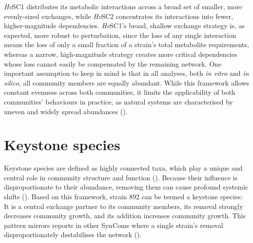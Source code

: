 \textit{Hv}SC1 distributes its metabolic interactions across a broad set of smaller, more evenly-sized exchanges, while \textit{Hv}SC2 concentrates its interactions into fewer, higher-magnitude dependencies. \textit{Hv}SC1’s broad, shallow exchange strategy is, as expected, more robust to perturbation, since the loss of any single interaction means the loss of only a small fraction of a strain's total metabolite requirements, whereas a narrow, high-magnitude strategy creates more critical dependencies whose loss cannot easily be compensated by the remaining network.
One important assumption to keep in mind is that in all analyses, both \textit{in vitro }and\textit{ in silico}, all community members are equally abundant. While this framework allows constant evenness across both communities, it limits the applicability of both communities’ behaviours in practice, as natural systems are characterised by uneven and widely spread abundances (\cite{dawson_small_2017}).

\section{Keystone species}
Keystone species are defined as highly connected taxa, which play a unique and central role in community structure and function (\cite{banerjee_keystone_2018}). Because their influence is disproportionate to their abundance, removing them can cause profound systemic shifts (\cite{carlstrom_synthetic_2019}). Based on this framework, strain 892 can be termed a keystone species: It is a central exchange partner to its community members, its removal strongly decreases community growth, and its addition increases community growth. This pattern mirrors reports in other SynComs where a single strain's removal disproportionately destabilises the network (\cite{krumbach_metabolic_2021, sun_metabolic_2023}).
\\


